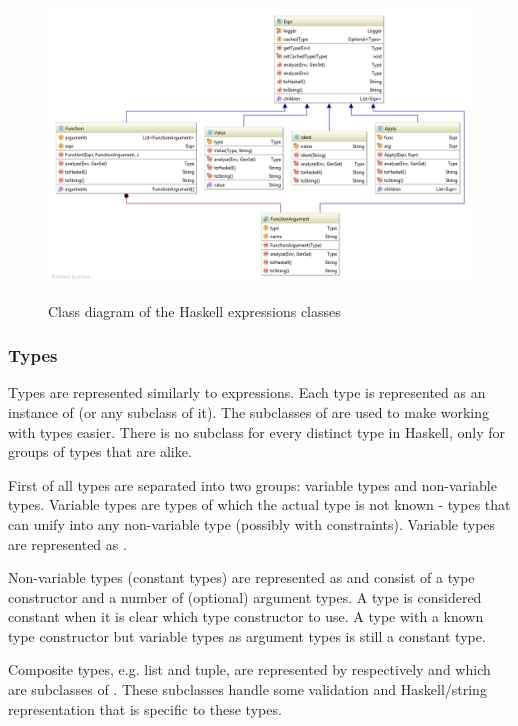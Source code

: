 \begin{figure}[h]
\centering
\includegraphics[scale=0.4]{Images/classdiagram-expr}
\label{fig:classdiagram-expr}
\caption{Class diagram of the Haskell expressions classes}
\end{figure}

\subsubsection{Types}

Types are represented similarly to expressions.
Each type is represented as an instance of  (or any subclass of it).
The subclasses of  are used to make working with types easier.
There is no subclass for every distinct type in Haskell, only for groups of types that are alike.

First of all types are separated into two groups: variable types and non-variable types.
Variable types are types of which the actual type is not known - types that can unify into any non-variable type (possibly with constraints).
Variable types are represented as .

Non-variable types (constant types) are represented as  and consist of a type constructor and a number of (optional) argument types.
A type is considered constant when it is clear which type constructor to use. A type with a known type constructor but variable types as argument types is still a constant type.

Composite types, e.g. list and tuple, are represented by respectively  and  which are subclasses of .
These subclasses handle some validation and Haskell/string representation that is specific to these types.

